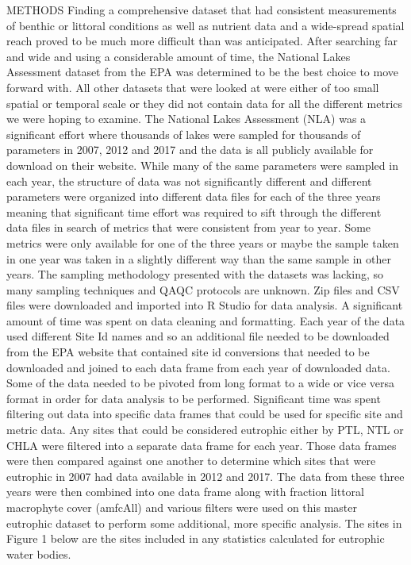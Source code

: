 \documentclass[
]{book}
\begin{document}
METHODS
Finding a comprehensive dataset that had consistent measurements of benthic or littoral conditions as well as nutrient data and a wide-spread spatial reach proved to be much more difficult than was anticipated. After searching far and wide and using a considerable amount of time, the National Lakes Assessment dataset from the EPA was determined to be the best choice to move forward with. All other datasets that were looked at were either of too small spatial or temporal scale or they did not contain data for all the different metrics we were hoping to examine.
The National Lakes Assessment (NLA) was a significant effort where thousands of lakes were sampled for thousands of parameters in 2007, 2012 and 2017 and the data is all publicly available for download on their website. While many of the same parameters were sampled in each year, the structure of data was not significantly different and different parameters were organized into different data files for each of the three years meaning that significant time effort was required to sift through the different data files in search of metrics that were consistent from year to year. Some metrics were only available for one of the three years or maybe the sample taken in one year was taken in a slightly different way than the same sample in other years. The sampling methodology presented with the datasets was lacking, so many sampling techniques and QAQC protocols are unknown.
Zip files and CSV files were downloaded and imported into R Studio for data analysis. A significant amount of time was spent on data cleaning and formatting. Each year of the data used different Site Id names and so an additional file needed to be downloaded from the EPA website that contained site id conversions that needed to be downloaded and joined to each data frame from each year of downloaded data. Some of the data needed to be pivoted from long format to a wide or vice versa format in order for data analysis to be performed. Significant time was spent filtering out data into specific data frames that could be used for specific site and metric data.
Any sites that could be considered eutrophic either by PTL, NTL or CHLA were filtered into a separate data frame for each year. Those data frames were then compared against one another to determine which sites that were eutrophic in 2007 had data available in 2012 and 2017. The data from these three years were then combined into one data frame along with fraction littoral macrophyte cover (amfcAll) and various filters were used on this master eutrophic dataset to perform some additional, more specific analysis. The sites in Figure 1 below are the sites included in any statistics calculated for eutrophic water bodies.
\end{document}
